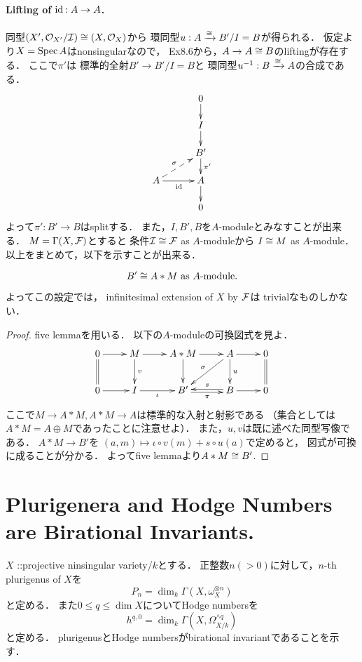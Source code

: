 \documentclass[a4paper]{jsarticle}
\newcommand{\Der}{\Omega}
\newcommand{\shCano}{\omega}
\begin{document}
    \paragraph{Lifting of $\mathrm{id}_{\!}: A \to A$.}
    同型$(X', \mathcal{O}_{X'}/\mathcal{I}) \cong (X, \mathcal{O}_X)$から
    環同型$u: A \xrightarrow{\cong} B'/I=B$が得られる．
    仮定より$X=\operatorname{Spec} A$はnonsingularなので，
    Ex8.6から，$A \to A \cong B$のliftingが存在する．
    ここで$\pi'$は
    標準的全射$B' \to B'/I=B$と
    環同型$u^{-1}: B \xrightarrow{\cong} A$の合成である．
    \[
    \xymatrix@R=15pt@C=30pt
    {
        {}   & 0 \ar[d]\\
        {}   & I \ar[d]\\
        {}   & B' \ar[d]^-{\pi'}\\
        A \ar[r]_-{\id}\ar@{-->}[ru]^-{\sigma}& A \ar[d]\\
        {} & 0 \\
    }
    \]
    よって$\pi': B' \to B$はsplitする．
    また，$I, B', B$を$A$-moduleとみなすことが出来る．
    $M=\Gamma(X, \mathcal{F})$とすると
    条件$\mathcal{I} \cong \mathcal{F}$ as $A$-moduleから
    $I \cong M$ as $A$-module．
    以上をまとめて，以下を示すことが出来る．
    \begin{Claim}
        \[ B' \cong A \ast M \text{ as $A$-module}. \]
    \end{Claim}
    よってこの設定では，
    infinitesimal extension of $X$ by $\mathcal{F}$は
    trivialなものしかない．
    \begin{proof}
        five lemmaを用いる．
        以下の$A$-moduleの可換図式を見よ．
        \[
        \xymatrix
        {
            0 \ar[r]\ar@{=}[d]& M \ar[r]\ar[d]^-{v}&
            A \ast M \ar[r]\ar[d]& A \ar[r]\ar[d]^-{u}\ar[ld]_-{\sigma}& 0 \ar@{=}[d]\\
            0 \ar[r]& I \ar[r]_-{\iota}& B' \ar@<-1.5pt>[r]_-{\pi}& B \ar[r]\ar@<-1.5pt>[l]_-{s}& 0
        }
        \]
        ここで$M \to A \ast M, A \ast M \to A$は標準的な入射と射影である
        （集合としては$A \ast M=A \oplus M$であったことに注意せよ）．
        また，$u,v$は既に述べた同型写像である．
        $A \ast M \to B'$を
        $(a,m) \mapsto \iota \circ v(m)+s \circ u(a)$で定めると，
        図式が可換に成ることが分かる．
        よってfive lemmaより$A \ast M \cong B'$.
    \end{proof}
    
\section{Plurigenera and Hodge Numbers are Birational Invariants.} %
    $X$ ::projective ninsingular variety/$k$とする．
    正整数$n(>0)$に対して，$n$-th plurigenus of $X$を
    \[ P_n=\dim_k \Gamma(X, \shCano_X^{\otimes n}) \]
    と定める．
    また$0 \leq q \leq \dim X$についてHodge numbersを
    \[ h^{q,0}=\dim_k \Gamma(X, \Der_{X/k}^{\wedge q}) \]
    と定める．
    plurigenusとHodge numbersがbirational invariantであることを示す．
\end{document}
